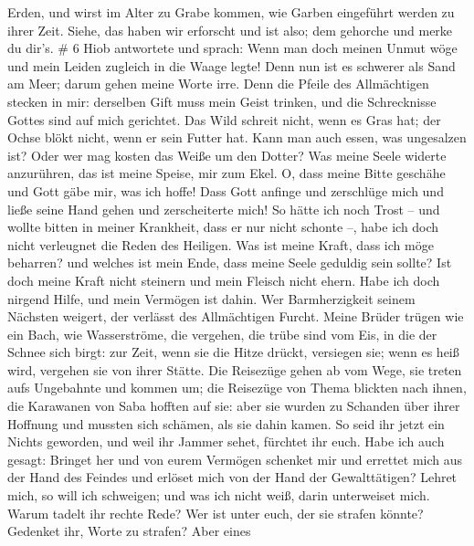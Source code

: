 Erden,  und wirst im Alter zu Grabe kommen, wie Garben
eingeführt werden zu ihrer Zeit.  Siehe, das haben wir
erforscht und ist also; dem gehorche und merke du dir's. \# 6
 Hiob antwortete und sprach:  Wenn man doch
meinen Unmut wöge und mein Leiden zugleich in die Waage legte!
 Denn nun ist es schwerer als Sand am Meer; darum gehen
meine Worte irre.  Denn die Pfeile des Allmächtigen stecken
in mir: derselben Gift muss mein Geist trinken, und die Schrecknisse
Gottes sind auf mich gerichtet.  Das Wild schreit nicht,
wenn es Gras hat; der Ochse blökt nicht, wenn er sein Futter hat.
 Kann man auch essen, was ungesalzen ist? Oder wer mag
kosten das Weiße um den Dotter?  Was meine Seele widerte
anzurühren, das ist meine Speise, mir zum Ekel.  O, dass
meine Bitte geschähe und Gott gäbe mir, was ich hoffe!  Dass
Gott anfinge und zerschlüge mich und ließe seine Hand gehen und
zerscheiterte mich!  So hätte ich noch Trost -- und wollte
bitten in meiner Krankheit, dass er nur nicht schonte --, habe ich doch
nicht verleugnet die Reden des Heiligen.  Was ist meine
Kraft, dass ich möge beharren? und welches ist mein Ende, dass meine
Seele geduldig sein sollte?  Ist doch meine Kraft nicht
steinern und mein Fleisch nicht ehern.  Habe ich doch
nirgend Hilfe, und mein Vermögen ist dahin.  Wer
Barmherzigkeit seinem Nächsten weigert, der verlässt des Allmächtigen
Furcht.  Meine Brüder trügen wie ein Bach, wie
Wasserströme, die vergehen,  die trübe sind vom Eis, in die
der Schnee sich birgt:  zur Zeit, wenn sie die Hitze
drückt, versiegen sie; wenn es heiß wird, vergehen sie von ihrer Stätte.
 Die Reisezüge gehen ab vom Wege, sie treten aufs
Ungebahnte und kommen um;  die Reisezüge von Thema blickten
nach ihnen, die Karawanen von Saba hofften auf sie:  aber
sie wurden zu Schanden über ihrer Hoffnung und mussten sich schämen, als
sie dahin kamen.  So seid ihr jetzt ein Nichts geworden,
und weil ihr Jammer sehet, fürchtet ihr euch.  Habe ich
auch gesagt: Bringet her und von eurem Vermögen schenket mir
 und errettet mich aus der Hand des Feindes und erlöset
mich von der Hand der Gewalttätigen?  Lehret mich, so will
ich schweigen; und was ich nicht weiß, darin unterweiset mich.
 Warum tadelt ihr rechte Rede? Wer ist unter euch, der sie
strafen könnte?  Gedenket ihr, Worte zu strafen? Aber eines
